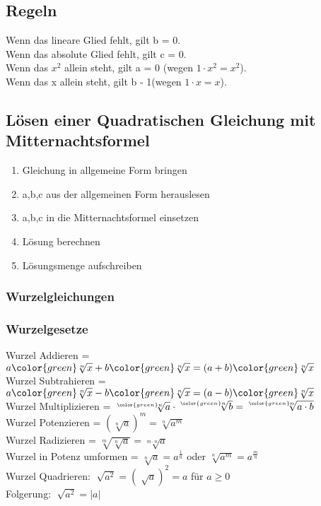 \begin{multicols*}{3}
\subsection*{Regeln}
Wenn das lineare Glied fehlt, gilt b = 0. \\
Wenn das absolute Glied fehlt, gilt c = 0. \\
Wenn das $x^2$ allein steht, gilt a = 0 (wegen $1 \cdot x^2 = x^2$).\\
Wenn das x allein steht, gilt b - 1(wegen $1 \cdot x = x$).
\subsection*{Lösen einer Quadratischen Gleichung mit Mitternachtsformel}
\begin{enumerate}
    \item Gleichung in allgemeine Form bringen
    \item a,b,c aus der allgemeinen Form herauslesen
    \item a,b,c in die Mitternachtsformel einsetzen
    \item Lösung berechnen
    \item Lösungsmenge aufschreiben
\end{enumerate}
\subsubsection*{Wurzelgleichungen}
\subsubsection*{Wurzelgesetze}
Wurzel Addieren = $a{\color{green}\sqrt[n]{x}} + b{\color{green}\sqrt[n]{x}} = (a + b){\color{green}\sqrt[n]{x}}$ \\
Wurzel Subtrahieren = $a {\color{green}\sqrt[n]{x}} - b{\color{green}\sqrt[n]{x}} = (a - b){\color{green}\sqrt[n]{x}}$ \\
Wurzel Multiplizieren = $\sqrt[{\color{green}n}]{a} \cdot \sqrt[{\color{green}n}]{b} = \sqrt[{\color{green}n}]{a \cdot b}$ \\
Wurzel Potenzieren = $(\sqrt[n]{a})^m = \sqrt[n]{a^m}$ \\
Wurzel Radizieren = $\sqrt[m]{\sqrt[n]{a}} = \sqrt[m \cdot n]{a}$ \\
Wurzel in Potenz umformen = $\sqrt[n]{a} = a^{\frac{1}{n}}$ oder $\sqrt[n]{a^m} = a^{\frac{m}{n}}$ \\
Wurzel Quadrieren: $\sqrt[]{a^2} = {(\sqrt[]{a})}^2 = a$ für $a \geq 0$ \\
Folgerung: $\sqrt[]{a^2} = |a|$

\end{multicols*}
